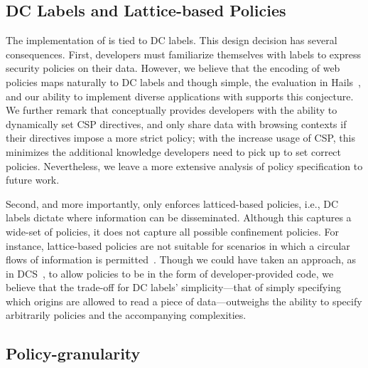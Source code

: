 
\subsection{DC Labels and Lattice-based Policies}

The implementation of \sys{} is tied to DC labels.
%
This design decision has several consequences.
%
First, developers must familiarize themselves with labels to express
security policies on their data.
%
However, we believe that the encoding of web policies maps naturally
to DC labels and though simple, the evaluation in
Hails~, and our ability to implement diverse
applications with \sys{} supports this conjecture.
%
We further remark that \sys{} conceptually provides developers with
the ability to dynamically set CSP directives, and only share data
with browsing contexts if their directives impose a more strict
policy; with the increase usage of CSP, this minimizes the additional
knowledge developers need to pick up to set correct policies.
%
Nevertheless, we leave a more extensive analysis of policy
specification to future work.
 
Second, and more importantly, \sys{} only enforces latticed-based
policies, i.e., DC labels dictate where information can be
disseminated.
%
Although this captures a wide-set of policies, it does not capture all
possible confinement policies.
%
For instance, lattice-based policies are not suitable for scenarios in
which a circular flows of information is permitted~\cite{Badger:1995}.
%
Though we could have taken an approach, as in DCS~\cite{Akhawe2013},
to allow policies to be in the form of developer-provided code, we
believe that the trade-off for DC labels' simplicity---that of simply
specifying which origins are allowed to read a piece of
data---outweighs the ability to specify arbitrarily policies and the
accompanying complexities.


\subsection{Policy-granularity}

